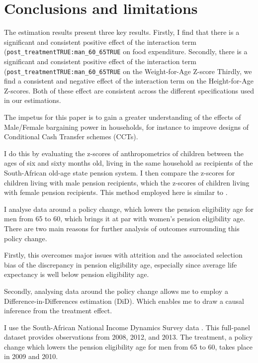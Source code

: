 \documentclass[a4paper,british]{article}\usepackage[]{graphicx}\usepackage[]{color}
\newcommand{\code}[1]{\texttt{#1}}
\begin{document}
\section{Conclusions and limitations}

\label{sec:conclusions}

The estimation results present three key results. Firstly, I find
that there is a significant and consistent positive effect of the
interaction term (\code{post\_treatmentTRUE:man\_60\_65TRUE} on food
expenditure. Secondly, there is a significant and consistent positive
effect of the interaction term (\code{post\_treatmentTRUE:man\_60\_65TRUE}
on the Weight-for-Age Z-score Thirdly, we find a consistent and negative
effect of the interaction term on the Height-for-Age Z-scores. Both
of these effect are consistent across the different specifications
used in our estimations.

The impetus for this paper is to gain a greater understanding of the
effects of Male/Female bargaining power in households, for instance
to improve designs of Conditional Cash Transfer schemes (CCTs). 

I do this by evaluating the z-scores of anthropometrics of children
between the ages of six and sixty months old, living in the same household
as recipients of the South-African old-age state pension system. I
then compare the z-scores for children living with male pension recipients,
which the z-scores of children living with female pension recipients.
This method employed here is similar to \citet{duflo2000child,duflo2003grandmothers}. 

I analyse data around a policy change, which lowers the pension eligibility
age for men from 65 to 60, which brings it at par with women's pension
eligibility age. There are two main reasons for further analysis of
outcomes surrounding this policy change.

Firstly, this overcomes major issues with attrition and the associated
selection bias of the discrepancy in pension eligibility age, especially
since average life expectancy is well below pension eligibility age.

Secondly, analysing data around the policy change allows me to employ
a Difference-in-Differences estimation (DiD). Which enables me to
draw a causal inference from the treatment effect.

I use the South-African National Income Dynamics Survey data \citep[jointly with The World Bank]{saldru2008nids,saldru2012nids,saldru2013nids}.
This full-panel dataset provides observations from 2008, 2012, and
2013. The treatment, a policy change which lowers the pension eligibility
age for men from 65 to 60, takes place in 2009 and 2010.  
\end{document}
